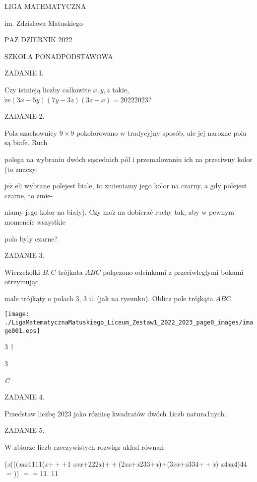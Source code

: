 \documentclass[a4paper,12pt]{article}
\begin{document}
LIGA MATEMATYCZNA

im. Zdzislawa Matuskiego

$\mathrm{P}\mathrm{A}\dot{\mathrm{Z}}$ DZIERNIK 2022

SZKOLA PONADPODSTAWOWA

ZADANIE I.

Czy istnieją liczby całkowite $x, y, z$ takie, $\dot{\mathrm{z}}\mathrm{e}(3x-5y)(7y-3z)(3z-x)=20222023$?

ZADANIE 2.

Pola szachownicy $9\times 9$ pokolorowano w tradycyjny sposób, ale jej narozne pola są biafe. Ruch

polega na wybraniu dwóch sąsiednich pól i przemalowaniu ich na przeciwny kolor (to znaczy:

$\mathrm{j}\mathrm{e}\dot{\mathrm{z}}$ eli wybrane polejest biale, to zmieniamy jego kolor na czarny, a gdy polejest czarne, to zmie-

niamy jego kolor na biały). Czy $\mathrm{m}\mathrm{o}\dot{\mathrm{z}}$ na dobierać ruchy tak, aby w pewnym momencie wszystkie

pola byly czarne?

ZADANIE 3.

Wierzcholki $B, C$ trójkata $ABC$ polączono odcinkami z przeciwleglymi bokami otrzymując

male trójkąty o polach 3, 3 $\mathrm{i}1$ (jak na rysunku). Oblicz pole trójkąta $ABC.$
\begin{center}
\texttt{[image: ./LigaMatematycznaMatuskiego\_Liceum\_Zestaw1\_2022\_2023\_page0\_images/image001.eps]}
\end{center}
3 1

3

{\it C}

ZADANIE 4.

Przedstaw liczbę 2023 jako róznicę kwadratów dwóch 1iczb natura1nych.

ZADANIE 5.

W zbiorze liczb rzeczywistych rozwiąz uklad równań

({\it x}((({\it xxx}1111({\it x}$+++$1 {\it xxx}$+$222{\it x})$++$(2{\it xx}$+${\it x}233$+${\it x})$+$(3{\it xx}$+${\it x}334$++${\it x}) {\it x}4{\it xx}4)44$=$)) $==$11. 11
\end{document}
